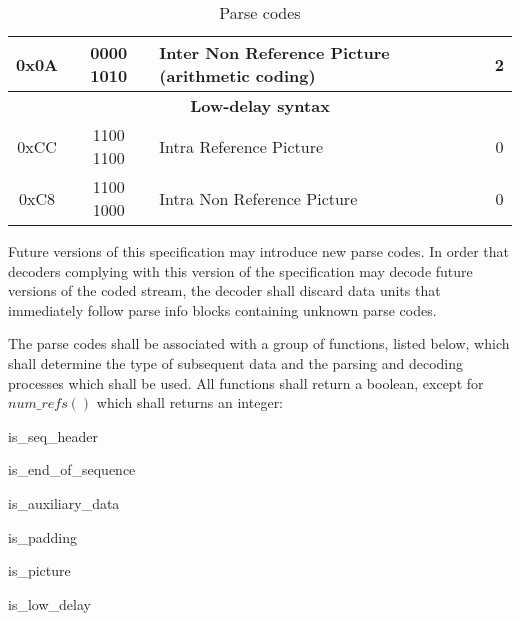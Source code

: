 \begin{table}[!ht]
\begin{tabular}{|c|c|l|c|}
\hline
0x0A & 0000 1010 & Inter Non Reference Picture (arithmetic coding) & 2\\
\hline
\multicolumn{4}{|c|}{\cellcolor[gray]{0.85}\bf Low-delay syntax}\\
\hline
0xCC & 1100 1100 & Intra Reference Picture & 0\\
\hline
0xC8 & 1100 1000 & Intra Non Reference Picture & 0\\
\hline
\end{tabular}
\caption{Parse codes}\label{table:parsecodes}
\end{table}

Future versions of this specification may introduce new parse codes. In order that 
decoders complying with this version of the specification may decode future 
versions of the coded stream, the decoder shall discard data units that immediately 
follow parse info blocks containing unknown parse codes. 

The parse codes shall be associated with a group of functions, listed below, which shall determine the type of subsequent data and the parsing and decoding processes which 
shall be used. All functions shall return a
boolean, except for $num\_refs()$ which shall returns an integer:

\begin{pseudo}{is\_seq\_header}{}
\end{pseudo}

\begin{pseudo}{is\_end\_of\_sequence}{}
\end{pseudo}

\begin{pseudo}{is\_auxiliary\_data}{}
\end{pseudo}

\begin{pseudo}{is\_padding}{}
\end{pseudo}

\begin{pseudo}{is\_picture}{}
\end{pseudo}

\begin{pseudo}{is\_low\_delay}{}
\end{pseudo}

